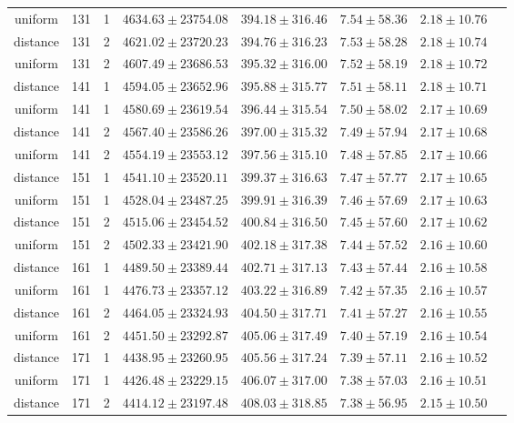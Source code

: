 \begin{tabular}{cccrrrrr}
uniform & 131 & 1 & $4634.63 \pm 23754.08$ & $394.18 \pm 316.46$ & $7.54 \pm 58.36$ & $2.18 \pm 10.76$\\
distance & 131 & 2 & $4621.02 \pm 23720.23$ & $394.76 \pm 316.23$ & $7.53 \pm 58.28$ & $2.18 \pm 10.74$\\
uniform & 131 & 2 & $4607.49 \pm 23686.53$ & $395.32 \pm 316.00$ & $7.52 \pm 58.19$ & $2.18 \pm 10.72$\\
distance & 141 & 1 & $4594.05 \pm 23652.96$ & $395.88 \pm 315.77$ & $7.51 \pm 58.11$ & $2.18 \pm 10.71$\\
uniform & 141 & 1 & $4580.69 \pm 23619.54$ & $396.44 \pm 315.54$ & $7.50 \pm 58.02$ & $2.17 \pm 10.69$\\
distance & 141 & 2 & $4567.40 \pm 23586.26$ & $397.00 \pm 315.32$ & $7.49 \pm 57.94$ & $2.17 \pm 10.68$\\
uniform & 141 & 2 & $4554.19 \pm 23553.12$ & $397.56 \pm 315.10$ & $7.48 \pm 57.85$ & $2.17 \pm 10.66$\\
distance & 151 & 1 & $4541.10 \pm 23520.11$ & $399.37 \pm 316.63$ & $7.47 \pm 57.77$ & $2.17 \pm 10.65$\\
uniform & 151 & 1 & $4528.04 \pm 23487.25$ & $399.91 \pm 316.39$ & $7.46 \pm 57.69$ & $2.17 \pm 10.63$\\
distance & 151 & 2 & $4515.06 \pm 23454.52$ & $400.84 \pm 316.50$ & $7.45 \pm 57.60$ & $2.17 \pm 10.62$\\
uniform & 151 & 2 & $4502.33 \pm 23421.90$ & $402.18 \pm 317.38$ & $7.44 \pm 57.52$ & $2.16 \pm 10.60$\\
distance & 161 & 1 & $4489.50 \pm 23389.44$ & $402.71 \pm 317.13$ & $7.43 \pm 57.44$ & $2.16 \pm 10.58$\\
uniform & 161 & 1 & $4476.73 \pm 23357.12$ & $403.22 \pm 316.89$ & $7.42 \pm 57.35$ & $2.16 \pm 10.57$\\
distance & 161 & 2 & $4464.05 \pm 23324.93$ & $404.50 \pm 317.71$ & $7.41 \pm 57.27$ & $2.16 \pm 10.55$\\
uniform & 161 & 2 & $4451.50 \pm 23292.87$ & $405.06 \pm 317.49$ & $7.40 \pm 57.19$ & $2.16 \pm 10.54$\\
distance & 171 & 1 & $4438.95 \pm 23260.95$ & $405.56 \pm 317.24$ & $7.39 \pm 57.11$ & $2.16 \pm 10.52$\\
uniform & 171 & 1 & $4426.48 \pm 23229.15$ & $406.07 \pm 317.00$ & $7.38 \pm 57.03$ & $2.16 \pm 10.51$\\
distance & 171 & 2 & $4414.12 \pm 23197.48$ & $408.03 \pm 318.85$ & $7.38 \pm 56.95$ & $2.15 \pm 10.50$\\

\end{tabular}
